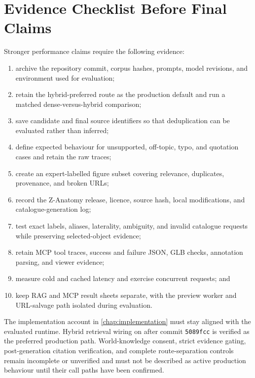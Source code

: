 \section{Evidence Checklist Before Final Claims}
\label{sec:evolution-evidence-checklist}

Stronger performance claims require the following evidence:

\begin{enumerate}[leftmargin=*,itemsep=0.15em,topsep=0.3em]
  \item archive the repository commit, corpus hashes, prompts, model revisions, and environment used for evaluation;
  \item retain the hybrid-preferred route as the production default and run a matched dense-versus-hybrid comparison;
  \item save candidate and final source identifiers so that deduplication can be evaluated rather than inferred;
  \item define expected behaviour for unsupported, off-topic, typo, and quotation cases and retain the raw traces;
  \item create an expert-labelled figure subset covering relevance, duplicates, provenance, and broken URLs;
  \item record the Z-Anatomy release, licence, source hash, local modifications, and catalogue-generation log;
  \item test exact labels, aliases, laterality, ambiguity, and invalid catalogue requests while preserving selected-object evidence;
  \item retain MCP tool traces, success and failure JSON, GLB checks, annotation parsing, and viewer evidence;
  \item measure cold and cached latency and exercise concurrent requests; and
  \item keep RAG and MCP result sheets separate, with the preview worker and URL-salvage path isolated during evaluation.
\end{enumerate}

The implementation account in \cref{chap:implementation} must stay aligned with the evaluated runtime. Hybrid retrieval wiring on  after commit \texttt{5089fcc} is verified as the preferred production path. World-knowledge consent, strict evidence gating, post-generation citation verification, and complete route-separation controls remain incomplete or unverified and must not be described as active production behaviour until their call paths have been confirmed.

